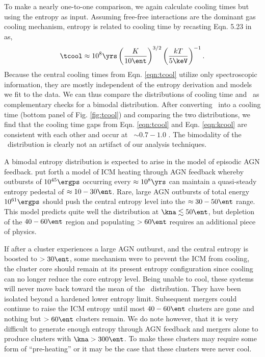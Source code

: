 \documentclass[12pt, preprint]{aastex}
\begin{document}
{{To make a nearly one-to-one comparison, we again calculate cooling
times but using the entropy as input. Assuming free-free
interactions are the dominant gas cooling mechanism, entropy is
related to cooling time by recasting Eqn. 5.23 in \cite{sarazinbook}
as, 
\begin{equation}
\tcool \approx 10^8 \yrs \left(\frac{K}{10 \ent}\right)^{3/2} \left(\frac{kT}{5 \keV}\right)^{-1}.
\label{eqn:kcool}
\end{equation}
Because the central cooling times from Eqn. \ref{eqn:tcool} utilize
only spectroscopic information, they are mostly independent of the
entropy derivation and models we fit to the data. We can thus compare
the distributions of cooling time and \kna\ as complementary checks
for a bimodal distribution. After converting \kna\ into a cooling time
(bottom panel of Fig. \ref{fig:tcool}) and comparing the two
distributions, we find that the cooling time gaps from
Eqn. \ref{eqn:tcool} and Eqn. \ref{eqn:kcool} are consistent with each
other and occur at \tcool\ $\sim 0.7-1.0$ \Gyrs. The bimodality of the
\kna\ distribution is clearly not an artifact of our analysis
techniques.

A bimodal entropy distribution is expected to arise in the model of
episodic AGN feedback. \cite{2005ApJ...634..955V} put forth a model of
ICM heating through AGN feedback whereby outbursts of $10^{45} \ergps$
occurring every $\approx 10^8 \yrs$ can maintain a quasi-steady entropy
pedestal of $\approx 10-30 \ent$. Rare, large AGN outbursts of total
energy $10^{61} \ergps$ should push the central entropy level into the
$\approx 30-50 \ent$ range. This model predicts quite well the
distribution at $\kna \lesssim 50 \ent$, but depletion of the $40-60
\ent$ region and populating $> 60 \ent$ requires an additional piece
of physics.

If after a cluster experiences a large AGN outburst, and the central
entropy is boosted to $> 30 \ent$, some mechanism were to prevent the
ICM from cooling, the cluster core should remain at its present
entropy configuration since cooling can no longer reduce the core
entropy level. Being unable to cool, these systems will never move
back toward the mean of the \kna\ distribution. They have been
isolated beyond a hardened lower entropy limit. Subsequent mergers
could continue to raise the ICM entropy until most $40-60 \ent$
clusters are gone and nothing but $> 60 \ent$ clusters remain. We do
note however, that it is very difficult to generate enough entropy
through AGN feedback and mergers alone to produce clusters with $\kna
> 300 \ent$. To make these clusters may require some form of
``pre-heating'' or it may be the case that these clusters were never
cool.

}}
\end{document}
